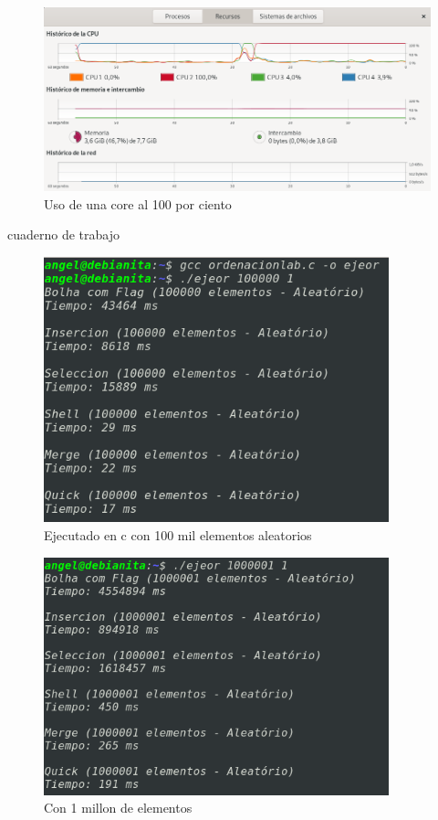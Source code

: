 \documentclass[a4paper]{article}
\begin{document}
\begin{figure}[H]%
\centering
\includegraphics[width=13cm]{imagenes/cpus.png}
\caption{Uso de una core al 100 por ciento}
\end{figure}


cuaderno de trabajo
\cite{colab}


\begin{figure}[H]%

\centering
\includegraphics[width=10cm]{imagenes/t100milc.png}
\caption{Ejecutado en c con 100 mil elementos aleatorios}

\end{figure}

\begin{figure}[H]%

\centering
\includegraphics[width=10cm]{imagenes/millon.png}
\caption{Con 1 millon de elementos}

\end{figure}
\end{document}

